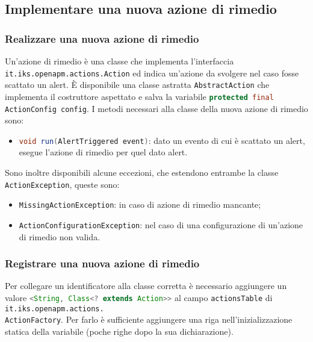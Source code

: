 \subsection{Implementare una nuova azione di rimedio}
\label{newazione}
	\subsubsection{Realizzare una nuova azione di rimedio}
			
		Un'azione di rimedio è una classe che implementa l'interfaccia \lstinline{it.iks.openapm.actions.Action} 
		ed indica un'azione da svolgere nel caso fosse scattato un alert.
		È disponibile una classe astratta \lstinline{AbstractAction} che implementa il costruttore aspettato e 
		salva la variabile \lstinline[language=Java]{protected final ActionConfig config}.
		I metodi necessari alla classe della nuova azione di rimedio sono:
		
		\begin{itemize}
		
			\item \lstinline[language=Java]{void run(AlertTriggered event)}:
				dato un evento di cui è scattato un alert, esegue l'azione di rimedio per quel dato alert.
		
		\end{itemize}
		
		Sono inoltre disponibili alcune eccezioni, che estendono entrambe la classe \lstinline{ActionException}, queste sono:
		\begin{itemize}
			\item \lstinline{MissingActionException}: in caso di azione di rimedio mancante;
			\item \lstinline{ActionConfigurationException}: nel caso di una configurazione di un'azione di rimedio non valida.
		\end{itemize}
	
	\subsubsection{Registrare una nuova azione di rimedio}
	
		Per collegare un identificatore alla classe corretta è necessario aggiungere un valore 
		\lstinline[language=Java]{<String, Class<? extends Action>>} al campo \lstinline{actionsTable} 
		di \lstinline{it.iks.openapm.actions.}\\ \lstinline{ActionFactory}. 
		Per farlo è sufficiente aggiungere una riga nell'inizializzazione statica della variabile 
		(poche righe dopo la sua dichiarazione).

